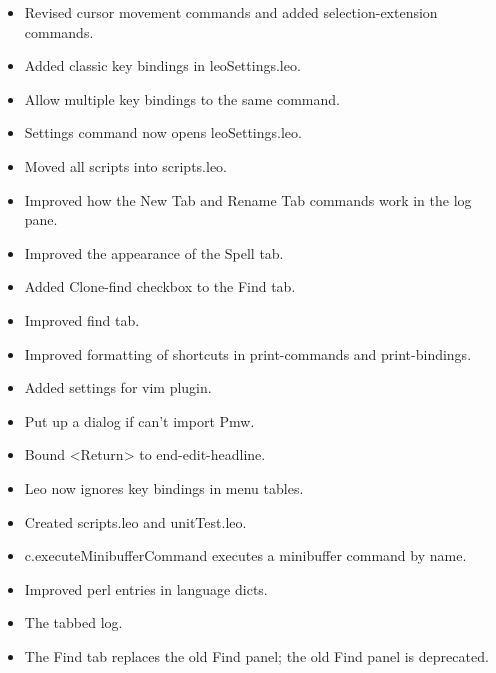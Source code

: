 \documentclass[a4paper,10pt,english]{sphinxmanual}
\begin{document}
\begin{itemize}
\item {} 
Revised cursor movement commands and added selection-extension commands.

\item {} 
Added classic key bindings in leoSettings.leo.

\item {} 
Allow multiple key bindings to the same command.

\item {} 
Settings command now opens leoSettings.leo.

\item {} 
Moved all scripts into scripts.leo.

\item {} 
Improved how the New Tab and Rename Tab commands work in the log pane.

\item {} 
Improved the appearance of the Spell tab.

\item {} 
Added Clone-find checkbox to the Find tab.

\item {} 
Improved find tab.

\item {} 
Improved formatting of shortcuts in print-commands and print-bindings.

\item {} 
Added settings for vim plugin.

\item {} 
Put up a dialog if can't import Pmw.

\item {} 
Bound \textless{}Return\textgreater{} to end-edit-headline.

\item {} 
Leo now ignores key bindings in menu tables.

\item {} 
Created scripts.leo and unitTest.leo.

\item {} 
c.executeMinibufferCommand executes a minibuffer command by name.

\item {} 
Improved perl entries in language dicts.

\item {} 
The tabbed log.

\item {} 
The Find tab replaces the old Find panel; the old Find panel is deprecated.

\end{itemize}
\end{document}
